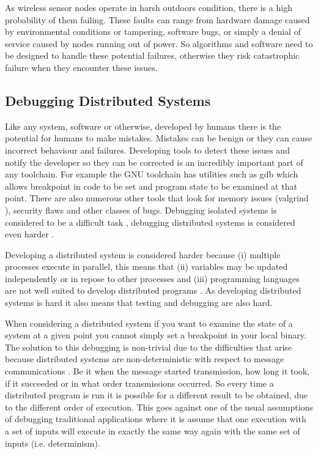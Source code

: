 As wireless sensor nodes operate in harsh outdoors condition, there is a high probability of them failing. These faults can range from hardware damage caused by environmental conditions or tampering, software bugs, or simply a denial of service caused by nodes running out of power. So algorithms and software need to be designed to handle these potential failures, otherwise they risk catastrophic failure when they encounter these issues.

\subsection{Debugging Distributed Systems}

Like any system, software or otherwise, developed by humans there is the potential for humans to make mistakes. Mistakes can be benign or they can cause incorrect behaviour and failures. Developing tools to detect these issues and notify the developer so they can be corrected is an incredibly important part of any toolchain. For example the GNU toolchain has utilities such as gdb \cite{?} which allows breakpoint in code to be set and program state to be examined at that point. There are also numerous other tools that look for memory issues (valgrind \cite{?}), security flaws \cite{?} and other classes of bugs. Debugging isolated systems is considered to be a difficult task \cite{?}, debugging distributed systems is considered even harder \cite{345131}.

Developing a distributed system is considered harder because (i) multiple processes execute in parallel, this means that (ii) variables may be updated independently or in repose to other processes and (iii) programming languages are not well suited to develop distributed programs \cite{93692,345131}. As developing distributed systems is hard it also means that testing and debugging are also hard.

When considering a distributed system if you want to examine the state of a system at a given point you cannot simply set a breakpoint in your local binary. The solution to this debugging is non-trivial due to the difficulties that arise because distributed systems are non-deterministic with respect to message communications \cite{?}. Be it when the message started transmission, how long it took, if it succeeded or in what order transmissions occurred. So every time a distributed program is run it is possible for a different result to be obtained, due to the different order of execution. This goes against one of the usual assumptions of debugging traditional applications where it is assume that one execution with a set of inputs will execute in exactly the same way again with the same set of inputs \cite{?} (i.e. determinism).

